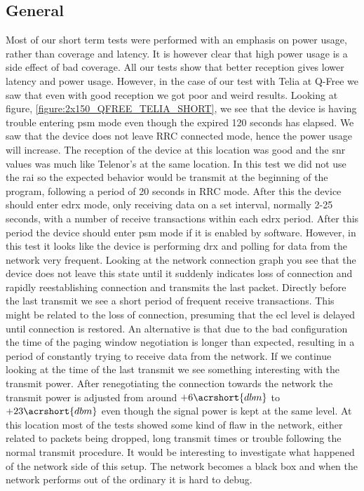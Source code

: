 \documentclass[USenglish]{ifimaster}  %
\begin{document}
\subsection{General} \label{ssection:generaltest}
Most of our short term tests were performed with an emphasis on power usage, rather than coverage and latency. It is however clear that high power usage is a side effect of bad coverage. All our tests show that better reception gives lower latency and power usage. However, in the case of our test with Telia at Q-Free we saw that even with good reception we got poor and weird results. Looking at figure, \vref{figure:2x150_QFREE_TELIA_SHORT}, we see that the device is having trouble entering \acrshort{psm} mode even though the expired 120 seconds has elapsed. We saw that the device does not leave RRC connected mode, hence the power usage will increase. The reception of the device at this location was good and the \acrshort{snr} values was much like Telenor's at the same location. In this test we did not use the \acrshort{rai} so the expected behavior would be transmit at the beginning of the program, following a period of 20 seconds in RRC mode. After this the device should enter \acrshort{edrx} mode, only receiving data on a set interval, normally 2-25 seconds, with a number of receive transactions within each \acrshort{edrx} period. After this period the device should enter \acrshort{psm} mode if it is enabled by software. However, in this test it looks like the device is performing \acrshort{drx} and polling for data from the network very frequent. Looking at the network connection graph you see that the device does not leave this state until it suddenly indicates loss of connection and rapidly reestablishing connection and transmits the last packet. Directly before the last transmit we see a short period of frequent receive transactions. This might be related to the loss of connection, presuming that the \acrshort{ecl} level is delayed until connection is restored. An alternative is that due to the bad configuration the time of the paging window negotiation is longer than expected, resulting in a period of constantly trying to receive data from the network. If we continue looking at the time of the last transmit we see something interesting with the transmit power. After renegotiating the connection towards the network the transmit power is adjusted from around ${+6 \acrshort{dbm}}$ to ${+23 \acrshort{dbm}}$ even though the signal power is kept at the same level. At this location most of the tests showed some kind of flaw in the network, either related to packets being dropped, long transmit times or trouble following the normal transmit procedure. It would be interesting to investigate what happened of the network side of this setup. The network becomes a black box and when the network performs out of the ordinary it is hard to debug.
\end{document}
